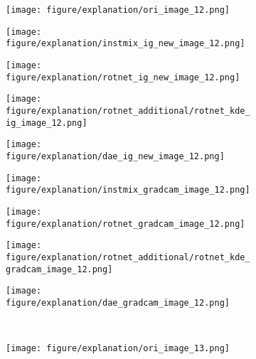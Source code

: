 \documentclass{article} \usepackage{iclr2021_conference,times}
\begin{document}
\begin{figure}[h!]
\begin{subfigure}{.11\textwidth}
  \centering
  \texttt{[image: figure/explanation/ori\_image\_12.png]}
\end{subfigure}
\hspace{-2mm}
\begin{subfigure}{.11\textwidth}
  \centering
  \texttt{[image: figure/explanation/instmix\_ig\_new\_image\_12.png]}
\end{subfigure}
\hspace{-2mm}
\begin{subfigure}{.11\textwidth}
  \centering
  \texttt{[image: figure/explanation/rotnet\_ig\_new\_image\_12.png]}
\end{subfigure}
\hspace{-2mm}
\begin{subfigure}{.11\textwidth}
  \centering
  \texttt{[image: figure/explanation/rotnet\_additional/rotnet\_kde\_ig\_image\_12.png]}
\end{subfigure}
\hspace{-2mm}
\begin{subfigure}{.11\textwidth}
  \centering
  \texttt{[image: figure/explanation/dae\_ig\_new\_image\_12.png]}
\end{subfigure}
\hspace{-2mm}
\begin{subfigure}{.11\textwidth}
  \centering
  \texttt{[image: figure/explanation/instmix\_gradcam\_image\_12.png]}
\end{subfigure}
\hspace{-2mm}
\begin{subfigure}{.11\textwidth}
  \centering
  \texttt{[image: figure/explanation/rotnet\_gradcam\_image\_12.png]}
\end{subfigure}
\hspace{-2mm}
\begin{subfigure}{.11\textwidth}
  \centering
  \texttt{[image: figure/explanation/rotnet\_additional/rotnet\_kde\_gradcam\_image\_12.png]}
\end{subfigure}
\hspace{-2mm}
\begin{subfigure}{.11\textwidth}
  \centering
  \texttt{[image: figure/explanation/dae\_gradcam\_image\_12.png]}
\end{subfigure}\\
\begin{subfigure}{.11\textwidth}
  \centering
  \texttt{[image: figure/explanation/ori\_image\_13.png]}

\end{subfigure}
\end{figure}
\end{document}
